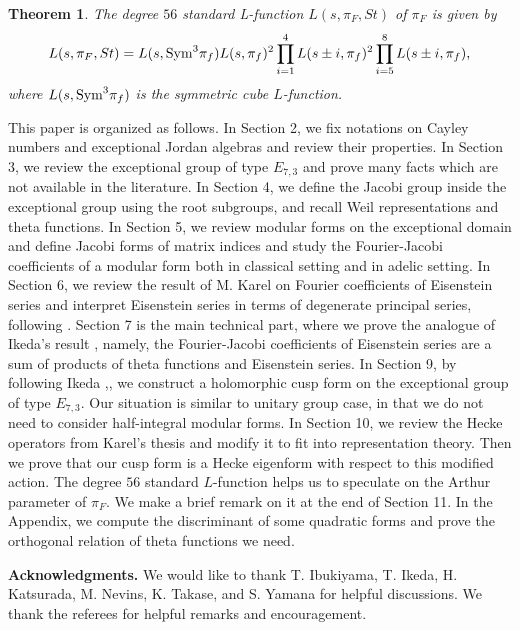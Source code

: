 \documentclass[11pt]{amsart}
\numberwithin{equation}{section}
\newtheorem{theorem}{Theorem}[section]
\theoremstyle{definition}
\begin{document}
\begin{theorem}\label{main-thm2} The degree $56$ standard L-function $L(s,\pi_F,St)$ of $\pi_F$ is given by
$$L(s,\pi_F,St)=L(s,{\rm Sym}^3 \pi_f)L(s,\pi_f)^2 \prod_{i=1}^4 L(s\pm i,\pi_f)^2 \prod_{i=5}^8 L(s\pm i, \pi_f),
$$
where $L(s,{\rm Sym}^3 \pi_f)$ is the symmetric cube $L$-function.
\end{theorem}

This paper is organized as follows. In Section 2, we fix notations on Cayley numbers and exceptional Jordan algebras and review their properties. In Section 3, we review the exceptional group of type $E_{7,3}$ and prove many facts which are not available in the literature. In Section 4, we define the Jacobi group inside the exceptional group using the root subgroups, and recall Weil representations and theta functions.
In Section 5, we review modular forms on the exceptional domain and define Jacobi forms of matrix indices and study the Fourier-Jacobi coefficients of a modular form
both in classical setting and in adelic setting. In Section 6, we review the result of M. Karel on Fourier coefficients of Eisenstein series and interpret Eisenstein series in terms of degenerate principal series, following \cite{Ku}. Section 7 is the main technical part, where we prove the analogue of Ikeda's result \cite{Ik3}, namely, the Fourier-Jacobi coefficients of Eisenstein series are a sum of products of theta functions and Eisenstein series. 
In Section 9, by following Ikeda \cite{Ik1},\cite{Ik2}, we construct a holomorphic cusp form on the exceptional group of type $E_{7,3}$.
Our situation is similar to unitary group case, in that we do not need to consider half-integral modular forms. 
In Section 10, we review the Hecke operators from Karel's thesis \cite{Ka1} and modify it to fit into representation theory. 
Then we prove that our cusp form is a Hecke eigenform with respect to this modified action. The degree $56$ standard $L$-function helps us to speculate on the Arthur parameter of $\pi_F$. We make a brief remark on it at the end of Section 11.
In the Appendix, we compute the discriminant of some quadratic forms and prove the orthogonal relation of theta functions we need. 

\medskip

\noindent\textbf{Acknowledgments.} We would like to thank T. Ibukiyama, T. Ikeda, H. Katsurada, M. Nevins, K. Takase, and S. Yamana for helpful discussions. We thank the referees for helpful remarks and encouragement. 
\end{document}
